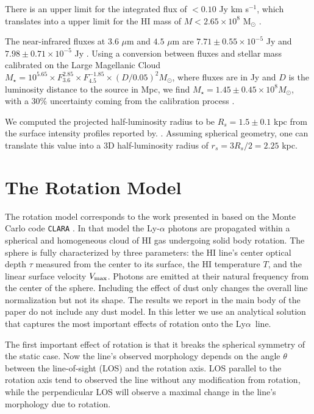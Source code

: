 \documentclass[a4paper, usenatbib, 12pt]{article}
\newcommand{\lya}{Ly$\alpha$}
\begin{document}
{There is an upper limit for the  
integrated flux of $<0.10$ Jy km s$^{-1}$, which translates into a
upper limit for the HI mass of $M<2.65\times 10^{8}$ M$_{\odot}$
\cite{pustilnikmartin07}.  

The near-infrared fluxes at $3.6$ $\mu$m and $4.5$ $\mu$m are
$7.71\pm0.55\times 10^{-5}$ Jy and $7.98\pm0.71\times 10^{-5}$ Jy
\cite{2008ApJ...678..804E}.  Using a conversion between fluxes and
stellar mass calibrated on the Large Magellanic Cloud $M_{\star} =
10^{5.65} \times F_{3.6}^{2.85} \times F_{4.5}^{-1.85} \times
(D/0.05)^2 M_{\odot}$, where fluxes are in Jy and $D$ is the luminosity
distance to the source in Mpc, we find $M_{\star} = 1.45\pm0.45\times 10^{8}
M_{\odot}$, with a $30\%$ uncertainty coming from the calibration
process \cite{2012AJ....143..139E}.  


We computed the projected half-luminosity radius to be $R_s=1.5\pm0.1$ kpc 
from the surface intensity profiles reported by.
\cite{2003A&A...410..481N}. 
Assuming spherical geometry, one can translate this value into a 3D
half-luminosity radius of $r_s=3R_s/2=2.25$ kpc.



\section*{The Rotation Model}

The rotation model corresponds to the work presented in
\cite{GaravitoCamargo2014} based on the Monte Carlo code
\texttt{CLARA} \cite{CLARA}. 
In that model the Ly-$\alpha$ photons are propagated 
within a spherical and homogeneous cloud of HI gas undergoing solid
body rotation.
The sphere is fully characterized by three parameters: the HI line's
center optical  depth $\tau$ measured from the center to its surface, the HI
temperature $T$, and the linear surface velocity $V_{\rm max}$.  
Photons are emitted at their natural frequency from the center of the
sphere. 
Including the effect of dust only changes the overall line
normalization but not its shape.  
The results we report in the main body of the paper do not include any
dust model.
In this letter we use an analytical solution that captures the most
important effects of rotation onto the \lya\ line.



The first important effect of rotation is that it breaks the spherical
symmetry of the static case. 
Now the line's observed morphology depends on the angle $\theta$ between the
line-of-sight (LOS) and the rotation axis. 
LOS parallel to the rotation axis tend to observed the line without
any modification from rotation, while the perpendicular LOS will
observe a maximal change in the line's morphology due to rotation.

}
\end{document}
